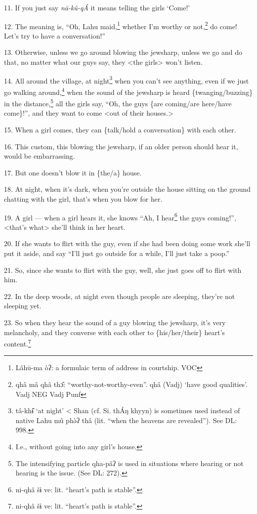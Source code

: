 11. If you just say \textit{nā-kû-qÁ} it means telling the girls `Come!'

12. The meaning is, ``Oh, Lahu maid,\footnote{Lâhū-ma òʔ: a formulaic term of address in courtship.  VOC} whether I'm worthy or not,\footnote{qhâ mâ qhâ thɔ̂: ``worthy-not-worthy-even''. qhâ (Vadj) `have good qualities'.   Vadj NEG Vadj Punf} do come!
Let's try to have a conversation!''

13. Otherwise, unless we go around blowing the jewsharp, unless we go and do that,
no matter what our guys say, they <the girls> won't listen.

14. All around the village, at night\footnote{tâ-khɨ̂ `at night' < Shan (cf. Si. thÁŋ khyyn) is sometimes used instead of native Lahu mû phə̀ʔ thâ (lit. ``when the heavens are revealed''). See DL: 998.} when you can't see anything, even if we
just go walking around,\footnote{I.e., without going into any girl's house.} when the sound of the jewsharp is heard \{twanging/buzzing\}
in the distance,\footnote{The intensifying particle qha-pâʔ is used in situations where hearing or not hearing is the issue. (See DL: 272).} all the girls say, ``Oh, the guys \{are coming/are here/have
come\}!'', and they want to come <out of their houses.>

15. When a girl comes, they can \{talk/hold a conversation\} with each other.

16. This custom, this blowing the jewsharp, if an older person should hear it,
would be embarrassing.

17. But one doesn't blow it in \{the/a\} house.

18. At night, when it's dark, when you're outside the house sitting on the ground
chatting with the girl, that's when you blow for her.

19. A girl --- when a girl hears it, she knows ``Ah, I hear\footnote{ni-qhâ šɨ ve: lit. ``heart's path is stable''.} the guys coming!'',
<that's what> she'll think in her heart.

20. If she wants to flirt with the guy, even if she had been doing some work she'll
put it aside, and say ``I'll just go outside for a while, I'll just take a poop.''

21. So, since she wants to flirt with the guy, well, she just goes off to flirt
with him.

22. In the deep woods, at night even though people are sleeping, they're not sleeping
yet.

23. So when they hear the sound of a guy blowing the jewsharp, it's very melancholy,
and they converse with each other to \{his/her/their\} heart's content.\footnote{ni-qhâ šɨ ve: lit. ``heart's path is stable''.}

